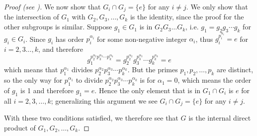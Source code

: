 \begin{proof}[Proof (see {\cite[Lemma 13.8]{judson_beezer_2022}})]
    We now show that $G_i \cap G_j = \{e\}$ for any $i \neq j$. We only show that the intersection of $G_1$ with $G_2, G_3, \dots, G_k$ is the identity, since the proof for the other subgroups is similar. Suppose $g_1 \in G_1$ is in $G_2G_3\dots G_k$, i.e. $g_1 = g_2g_3\cdots g_k$ for $g_i \in G_i$. Since $g_i$ has order $p_i^{\alpha_i}$ for some non-negative integer $\alpha_i$, thus $g_i^{p_i^{\alpha_i}} = e$ for $i = 2,3\dots,k$, and therefore
    \[
        g_1^{p_2^{\alpha_2}p_3^{\alpha_3}\cdots p_k^{\alpha_k}} = g_2^{p_2^{\alpha_2}}g_3^{p_3^{\alpha_3}}\cdots g_k^{p_k^{\alpha_k}} = e
    \]
    which means that $p_1^{\alpha_1}$ divides $p_2^{\alpha_2}p_3^{\alpha_3}\cdots p_k^{\alpha_k}$. But the primes $p_1, p_2, \dots, p_k$ are distinct, so the only way for $p_1^{\alpha_1}$ to divide $p_2^{\alpha_2}p_3^{\alpha_3}\cdots p_k^{\alpha_k}$ is for $\alpha_1 = 0$, which means the order of $g_1$ is 1 and therefore $g_1 = e$. Hence the only element that is in $G_1 \cap G_i$ is $e$ for all $i = 2, 3, \dots, k$; generalizing this argument we see $G_i \cap G_j = \{e\}$ for any $i \neq j$.

    With these two conditions satisfied, we therefore see that $G$ is the internal direct product of $G_1, G_2, \dots, G_k$.
\end{proof}

